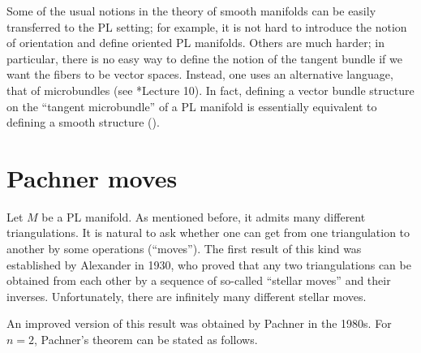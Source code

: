 Some of the usual notions in the theory of smooth manifolds can be easily
transferred to the PL setting; for example, it is not hard to introduce the
notion of orientation and define oriented PL manifolds. Others are much harder;
in particular, there is no easy way to define the notion of the tangent bundle
if we want the fibers to be vector spaces. Instead, one uses an alternative
language, that of microbundles (see *{Lecture 10}). In fact,
defining a vector bundle structure on the ``tangent microbundle'' of a PL
manifold is essentially equivalent to defining a smooth structure
().

\section{Pachner moves}\label{s:pachner}
Let $M$ be a PL manifold. As mentioned before, it admits many different
triangulations. It is natural to ask whether one can get from one triangulation
to another by some operations (``moves''). The first result of this kind was
established by Alexander in 1930, who proved that any two triangulations can be
obtained from each other by a sequence of so-called ``stellar moves'' and their
inverses. Unfortunately, there are infinitely many different stellar moves.

An improved version of this result was obtained by Pachner in the 1980s. For
$n=2$, Pachner's theorem can be stated as follows.

